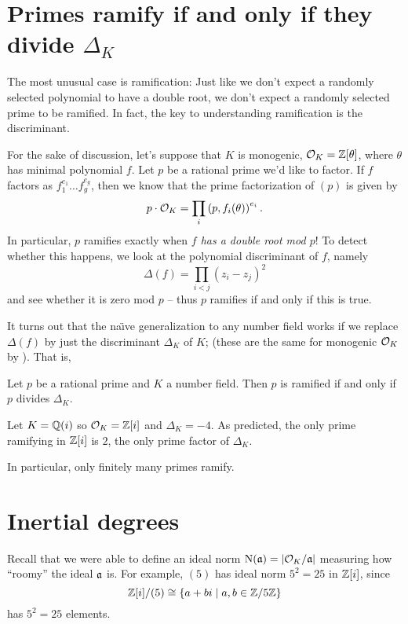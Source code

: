 \section{Primes ramify if and only if they divide $\Delta_K$}
The most unusual case is ramification:
Just like we don't expect a randomly selected polynomial to have a double root,
we don't expect a randomly selected prime to be ramified.
In fact, the key to understanding ramification is the discriminant.

For the sake of discussion, let's suppose that $K$ is monogenic,
$\mathcal O_K = \mathbb Z[\theta]$, where $\theta$ has minimal polynomial $f$.
Let $p$ be a rational prime we'd like to factor.
If $f$ factors as $f_1^{e_1} \dots f_g^{e_g}$, then we know that
the prime factorization of $(p)$ is given by
\[ p \cdot \mathcal O_K = \prod_i \left( p, f_i(\theta) \right)^{e_i}. \]
In particular, $p$ ramifies exactly when \emph{$f$ has a double root mod $p$}!
To detect whether this happens, we look at the polynomial discriminant of $f$,
namely
\[ \Delta(f) = \prod_{i<j} (z_i - z_j)^2 \]
and see whether it is zero mod $p$ -- thus $p$ ramifies if and only if this is true.

It turns out that the na\"{\i}ve generalization to any number field
works if we replace $\Delta(f)$ by just the discriminant $\Delta_K$ of $K$;
(these are the same for monogenic $\mathcal O_K$ by ).
That is,
\begin{theorem}
	Let $p$ be a rational prime and $K$ a number field.
	Then $p$ is ramified if and only if $p$ divides $\Delta_K$.
\end{theorem}
\begin{example}
	Let $K = \mathbb Q(i)$ so $\mathcal O_K = \mathbb Z[i]$ and $\Delta_K = -4$.
	As predicted, the only prime ramifying in $\mathbb Z[i]$ is $2$,
	the only prime factor of $\Delta_K$.
\end{example}
In particular, only finitely many primes ramify.

\section{Inertial degrees}

Recall that we were able to define an ideal norm
$\operatorname{N}(\mathfrak a) = \left\lvert \mathcal O_K / \mathfrak a \right\rvert$
measuring how ``roomy'' the ideal $\mathfrak a$ is.
For example, $(5)$ has ideal norm $5^2 = 25$ in $\mathbb Z[i]$, since
\[ \mathbb Z[i] / (5) \cong \left\{ a+bi \mid a,b \in \mathbb Z/5\mathbb Z \right\} \]
has $5^2 = 25$ elements.


